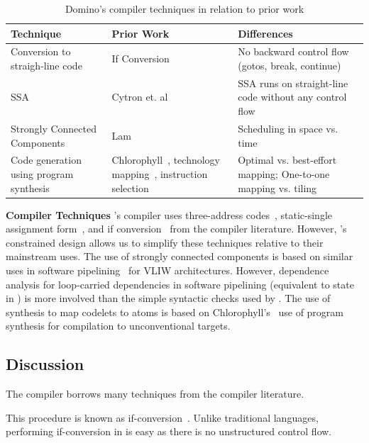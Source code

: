\begin{table}[!t]
  \begin{scriptsize}
    \begin{tabular}{|p{}|p{}|p{}|}
  \hline
  Technique & Prior Work & Differences \\
  \hline
  Conversion to straigh-line code & If Conversion~\cite{if_conversion} & No backward control flow (gotos, break, continue) \\
  \hline
  SSA & Cytron et. al~\cite{ssa} & SSA runs on straight-line code without any control flow \\
  \hline
  Strongly Connected Components & Lam~\cite{lam} & Scheduling in space vs. time \\ %
  \hline
  Code generation using program synthesis & Chlorophyll~\cite{chlorophyll}, technology mapping~\cite{technology_mapping}, instruction selection~\cite{instruction_selection} & Optimal vs. best-effort mapping; One-to-one mapping vs. tiling \\
  \hline
  \end{tabular}
  \end{scriptsize}
  \caption{Domino's compiler techniques in relation to prior work}
  \label{tab:prior_compiler}
\end{table}

\textbf{Compiler Techniques}
\pktlanguage's compiler uses three-address codes~\cite{tac}, static-single
assignment form~\cite{ssa}, and if conversion~\cite{if_conversion} from the
compiler literature. However, \pktlanguage's constrained design allows us to
simplify these techniques relative to their mainstream uses.  The use of
strongly connected components is based on similar uses in software
pipelining~\cite{software_pipelining} for VLIW architectures. However,
dependence analysis for loop-carried dependencies in software pipelining
(equivalent to state in \pktlanguage) is more involved than the simple
syntactic checks used by \pktlanguage. The use of synthesis to map codelets to
atoms is based on Chlorophyll's~\cite{chlorophyll} use of program synthesis for
compilation to unconventional targets.

\subsection{Discussion}
The \pktlanguage compiler borrows many techniques from the compiler literature.

This procedure is known as
if-conversion~\cite{if_conversion}. Unlike traditional languages, performing
if-conversion in \pktlanguage is easy as there is no unstructured control
flow.  
